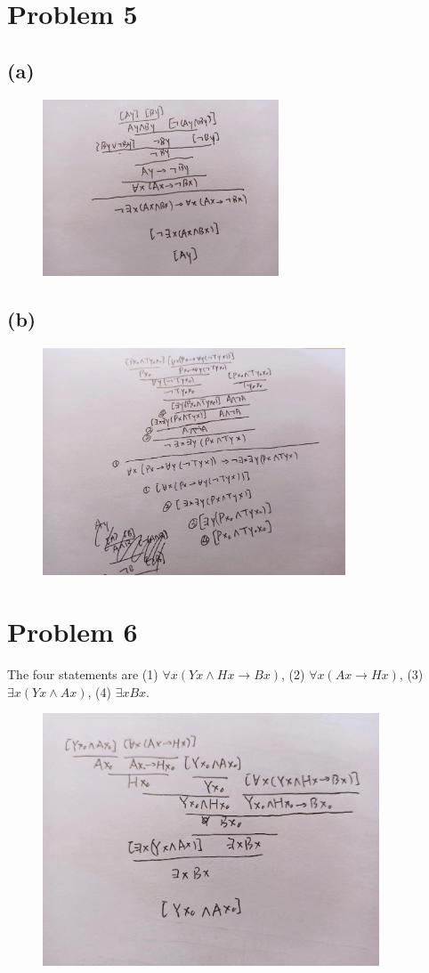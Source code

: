 \documentclass{article}
\begin{document}
\section*{Problem 5}

\subsection*{(a)}

\begin{figure}[htbp]
	\centering
	\includegraphics[width=7cm]{prob5a.jpg}
\end{figure}

\subsection*{(b)}

\begin{figure}[htbp]
	\centering
	\includegraphics[width=9cm]{prob5b.jpg}
\end{figure}



\section*{Problem 6}

The four statements are (1) $\forall x (Yx \land Hx \to Bx)$, (2) $\forall x (Ax \to Hx)$, (3) $\exists x (Yx \land Ax)$, (4) $\exists x Bx$.

\begin{figure}[htbp]
	\centering
	\includegraphics[width=10cm]{prob6.jpg}
\end{figure}
\end{document}

